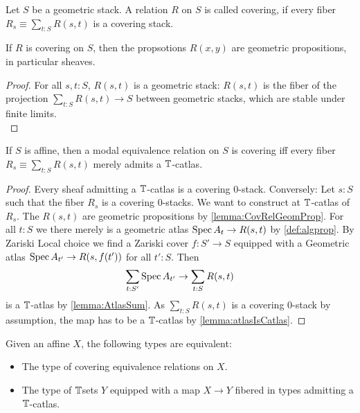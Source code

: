 	\begin{definition}{\label{def:coveringEqRel}}
		Let $S$ be a geometric stack. A relation $R$ on $S$ is called covering, if every fiber $R_s \equiv \sum_{t: S} R(s,t)$ is a covering stack. 
	\end{definition}
\begin{lemma}{\label{lemma:CovRelGeomProp}}
	If $R$ is covering on $S$, then the propsotions $R(x,y)$ are geometric propositions, in particular sheaves.
\end{lemma}
\begin{proof}
	 For all $s , t : S$, $R(s,t)$ is a geometric stack: $R(s,t)$ is the fiber of the projection $\sum_{t : S} R(s,t) \to S$ between geometric stacks, which are stable under finite limits. \\
\end{proof}
\begin{lemma}{\label{lemma:CovRel}}
	If $S$ is affine, then a modal equivalence relation on $S$ is covering iff every fiber $R_s \equiv \sum_{t: S} R(s,t)$ merely admits a $\mathbb{T}$-catlas.
\end{lemma}
\begin{proof}
	Every sheaf admitting a $\mathbb{T}$-catlas is a covering 0-stack. 
	Conversely: Let $s : S$ such that the fiber $R_s$ is a covering 0-stacks. We want to construct at $\mathbb{T}$-catlas of $R_s$.
	The $R(s,t)$ are geometric propositions by \ref{lemma:CovRelGeomProp}.
	For all $t : S$ we there merely is a geometric atlas $\operatorname{Spec} A_t \to R(s,t)$ by \ref{def:algprop}. By Zariski Local choice we find a Zariski cover $f : S' \to S$ equipped with a Geometric atlas $\operatorname{Spec} A_{t'} \to R(s,f (t'))$ for all $t' : S$. Then
	\[
	\sum_{t:S'} \operatorname{Spec} A_{t'} \to \sum_{t : S} R(s,t)
	\]
	is a $\mathbb{T}$-atlas by \ref{lemma:AtlasSum}. As $\sum_{t : S} R(s,t)$ is a covering 0-stack by assumption, the map has to be a $\mathbb{T}$-catlas by \ref{lemma:atlasIsCatlas}. 
\end{proof}

\begin{lemma}{\label{lemma:fundamental-property-algebraic-spaces}}
	Given an affine $X$, the following types are equivalent:
	\begin{itemize}
		\item The type of covering equivalence relations on $X$.
		\item The type of $\mathbb{T}$sets $Y$ equipped with a map $X \to Y$ fibered in types admitting a $\mathbb{T}$-catlas.
	\end{itemize}
\end{lemma}

